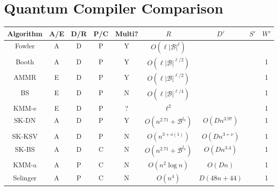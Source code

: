 \section{Quantum Compiler Comparison}
\label{sec:qcompile-compare}

\begin{landscape}

\begin{table}[hbt!]
\begin{tabular}{|c|c|c|c|c|c|c|c|c|}
\hline
Algorithm                  & A/E & D/R & P/C & Multi? & $R$                             & $D'$                    & $S'$                  & $W'$ \\
\hline
Fowler\cite{Fowler2011}     & A   & D   & P  & Y    & $O(\ell |\mathcal{B}|^{\ell})$    &                         &                       &     \\
Booth \cite{Booth2012}      & A   & D   & P  & Y    & $O(\ell |\mathcal{B}|^{\ell/2})$  &                         &                       & 1    \\
AMMR \cite{Amy2012}         & E   & D   & P  & Y    & $O(\ell |\mathcal{B}|^{\ell/2})$  &                         &                       & 1    \\
BS \cite{Bocharov2012}      & E   & D   & P  & N    & $O(\ell |\mathcal{B}|^{\ell/4})$  &                         &                       & 1    \\
KMM-e\cite{Kliuchnikov2012} & E   & D   & P  & ?    & $\ell^2$                          &                         &                       & 1    \\
SK-DN\cite{Dawson2005}      & A   & D   & P  & Y    & $O(n^{2.71} + \mathcal{B}^{l_0})$ & $O(D n^{3.97})$         &                       & 1    \\
SK-KSV\cite{Kitaev2002}     & A   & D   & P  & N    & $O(n^{3+o(1)})$                   & $O(D n^{3+\nu})$        &                       & 1    \\
SK-BS \cite{Bocharov2012}   & A   & D   & C  & N    & $O(n^{2.71} + \mathcal{B}^{l_0})$ & $O(Dn^{3.4})$           &                       & 1    \\
KMM-a\cite{Kliuchnikov2012b}& A   & P   & C  & N    & $O(n^2\log n)$                    & $O(Dn)$                 &                       & 1    \\
Selinger\cite{Selinger2012} & A   & P   & C  & N    & $O(n^4)$                          & $D(48n + 44)$           &                       & 1    \\

\end{tabular}
\end{table}
\end{landscape}
